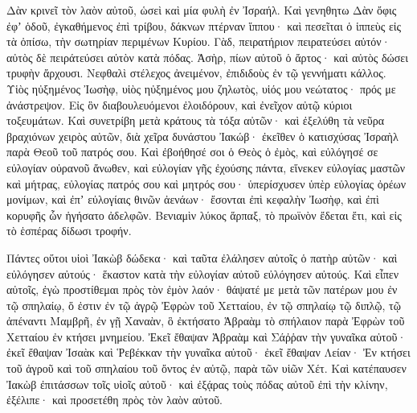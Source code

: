 {Δὰν κρινεῖ τὸν λαὸν αὐτοῦ, ὡσεὶ καὶ μία φυλὴ ἐν Ἰσραήλ.
Καὶ γενηθητω Δὰν ὄφις ἐφʼ ὁδοῦ, ἐγκαθήμενος ἐπὶ τρίβου, δάκνων πτέρναν ἵππου· καὶ πεσεῖται ὁ ἱππεὺς εἰς τὰ ὀπίσω,
τὴν σωτηρίαν περιμένων Κυρίου.
Γὰδ, πειρατήριον πειρατεύσει αὐτόν· αὐτὸς δὲ πειράτεύσει αὐτὸν κατὰ πόδας.
Ἀσὴρ, πίων αὐτοῦ ὁ ἄρτος· καὶ αὐτὸς δώσει τρυφὴν ἄρχουσι.
Νεφθαλὶ στέλεχος ἀνειμένον, ἐπιδιδοὺς ἐν τῷ γεννήματι κάλλος.
Υἱὸς ηὐξημένος Ἰωσὴφ, υἱὸς ηὐξημένος μου ζηλωτὸς, υἱός μου νεώτατος· πρός με ἀνάστρεψον.
Εἰς ὃν διαβουλευόμενοι ἐλοιδόρουν, καὶ ἐνεῖχον αὐτῷ κύριοι τοξευμάτων.
Καὶ συνετρίβη μετὰ κράτους τὰ τόξα αὐτῶν· καὶ ἐξελύθη τὰ νεῦρα βραχιόνων χειρὸς αὐτῶν, διὰ χεῖρα δυνάστου Ἰακώβ· ἐκεῖθεν ὁ κατισχύσας Ἰσραὴλ παρὰ Θεοῦ τοῦ πατρός σου.
Καὶ ἐβοήθησέ σοι ὁ Θεὸς ὁ ἐμὸς, καὶ εὐλόγησέ σε εὐλογίαν οὐρανοῦ ἄνωθεν, καὶ εὐλογίαν γῆς ἐχούσης πάντα, εἵνεκεν εὐλογίας μαστῶν καὶ μήτρας,
εὐλογίας πατρός σου καὶ μητρός σου· ὑπερίσχυσεν ὑπὲρ εὐλογίας ὀρέων μονίμων, καὶ ἐπʼ εὐλογίαις θινῶν ἀενάων· ἔσονται ἐπὶ κεφαλὴν Ἰωσὴφ, καὶ ἐπὶ κορυφῆς ὧν ἡγήσατο ἀδελφῶν.
Βενιαμὶν λύκος ἅρπαξ, τὸ πρωϊνὸν ἔδεται ἔτι, καὶ εἰς τὸ ἑσπέρας δίδωσι τροφήν.
\par }{\MM {}Πάντες οὕτοι υἱοὶ Ἰακὼβ δώδεκα· καὶ ταῦτα ἐλάλησεν αὐτοῖς ὁ πατὴρ αὐτῶν· καὶ εὐλόγησεν αὐτούς· ἕκαστον κατὰ τὴν εὐλογίαν αὐτοῦ εὐλόγησεν αὐτούς.
Καὶ εἶπεν αὐτοῖς, ἐγὼ προστίθεμαι πρὸς τὸν ἐμὸν λαόν· θάψατέ με μετὰ τῶν πατέρων μου ἐν τῷ σπηλαίῳ, ὅ ἐστιν ἐν τῷ ἀγρῷ Ἐφρὼν τοῦ Χετταίου,
ἐν τῷ σπηλαίῳ τῷ διπλῷ, τῷ ἀπέναντι Μαμβρῆ, ἐν γῇ Χαναὰν, ὃ ἐκτήσατο Ἁβραὰμ τὸ σπήλαιον παρὰ Ἐφρὼν τοῦ Χετταίου ἐν κτήσει μνημείου.
Ἐκεῖ ἔθαψαν Ἁβραὰμ καὶ Σάῤῥαν τὴν γυναῖκα αὐτοῦ· ἐκεῖ ἔθαψαν Ἰσαὰκ καὶ Ῥεβέκκαν τὴν γυναῖκα αὐτοῦ· ἐκεῖ ἔθαψαν Λείαν·
Ἐν κτήσει τοῦ ἀγροῦ καὶ τοῦ σπηλαίου τοῦ ὄντος ἐν αὐτῷ, παρὰ τῶν υἱῶν Χέτ.
Καὶ κατέπαυσεν Ἰακὼβ ἐπιτάσσων τοῖς υἱοῖς αὐτοῦ· καὶ ἐξᾴρας τοὺς πόδας αὐτοῦ ἐπὶ τὴν κλίνην, ἐξέλιπε· καὶ προσετέθη πρὸς τὸν λαὸν αὐτοῦ.

}
